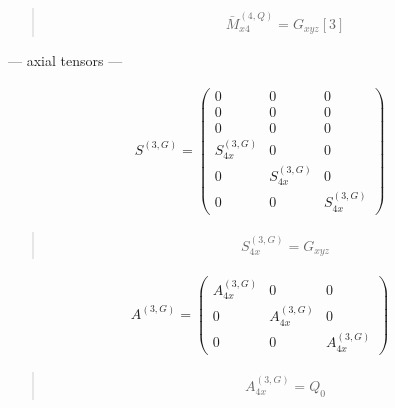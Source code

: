 \documentclass[fleqn,10pt]{jsarticle}
\begin{document}
\begin{quote}
\begin{align*}
& \bar{M}^{(4,Q)}_{x4} = G_{xyz}[3]
\end{align*}
\end{quote}
\newpage
\begin{center}\LARGE --- axial tensors ---\end{center}
\begin{align*}
S^{(3,G)} = \begin{pmatrix} 0 & 0 & 0 \\ 0 & 0 & 0 \\ 0 & 0 & 0 \\ S^{(3,G)}_{4x} & 0 & 0 \\ 0 & S^{(3,G)}_{4x} & 0 \\ 0 & 0 & S^{(3,G)}_{4x} \end{pmatrix}
\end{align*}
\begin{quote}
\begin{align*}
& S^{(3,G)}_{4x} = G_{xyz}
\end{align*}
\end{quote}
\begin{align*}
A^{(3,G)} = \begin{pmatrix} A^{(3,G)}_{4x} & 0 & 0 \\ 0 & A^{(3,G)}_{4x} & 0 \\ 0 & 0 & A^{(3,G)}_{4x} \end{pmatrix}
\end{align*}
\begin{quote}
\begin{align*}
& A^{(3,G)}_{4x} = Q_{0}
\end{align*}
\end{quote}
\end{document}
